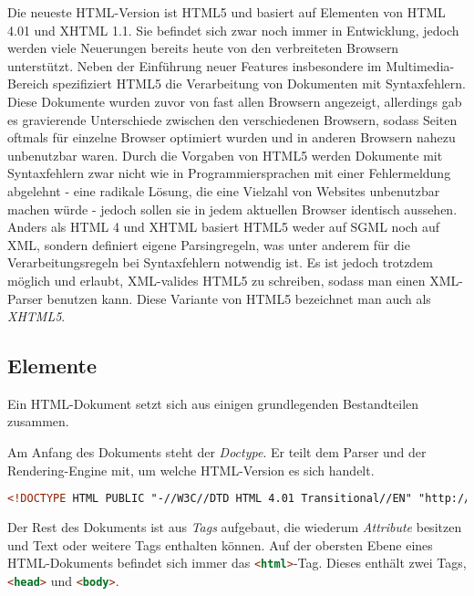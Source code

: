 Die neueste HTML-Version ist HTML5 und basiert auf Elementen von HTML 4.01 und XHTML 1.1.
Sie befindet sich zwar noch immer in Entwicklung, jedoch werden viele Neuerungen bereits heute von
den verbreiteten Browsern unterstützt. Neben der Einführung neuer Features insbesondere im
Multimedia-Bereich spezifiziert HTML5 die Verarbeitung von Dokumenten mit Syntaxfehlern. \citep{w3c:html5}
Diese Dokumente wurden zuvor von fast allen Browsern angezeigt, allerdings gab es gravierende
Unterschiede zwischen den verschiedenen Browsern, sodass Seiten oftmals für einzelne Browser
optimiert wurden und in anderen Browsern nahezu unbenutzbar waren. Durch die Vorgaben von HTML5
werden Dokumente mit Syntaxfehlern zwar nicht wie in Programmiersprachen mit einer Fehlermeldung
abgelehnt - eine radikale Lösung, die eine Vielzahl von Websites unbenutzbar machen würde - jedoch
sollen sie in jedem aktuellen Browser identisch aussehen.
Anders als HTML 4 und XHTML basiert HTML5 weder auf SGML noch auf XML, sondern definiert eigene
Parsingregeln, was unter anderem für die Verarbeitungsregeln bei Syntaxfehlern notwendig ist. Es ist
jedoch trotzdem möglich und erlaubt, XML-valides HTML5 zu schreiben, sodass man einen XML-Parser
benutzen kann. Diese Variante von HTML5 bezeichnet man auch als \emph{XHTML5}.



\subsection{Elemente}
Ein HTML-Dokument setzt sich aus einigen grundlegenden Bestandteilen zusammen.

Am Anfang des Dokuments steht der \emph{Doctype}. Er teilt dem Parser und der Rendering-Engine mit,
um welche HTML-Version es sich handelt.

\begin{lstlisting}[language=HTML,caption=Doctype von HTML 4.01]
<!DOCTYPE HTML PUBLIC "-//W3C//DTD HTML 4.01 Transitional//EN" "http://www.w3.org/TR/html4/loose.dtd">
\end{lstlisting}

Der Rest des Dokuments ist aus \emph{Tags} aufgebaut, die wiederum \emph{Attribute} besitzen und Text
oder weitere Tags enthalten können. Auf der obersten Ebene eines HTML-Dokuments befindet sich immer
das \lstinline[language=HTML]{<html>}-Tag. Dieses enthält zwei Tags,
\lstinline[language=HTML]{<head>} und \lstinline[language=HTML]{<body>}.

